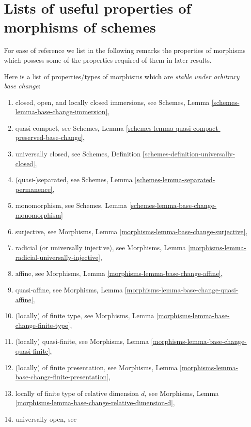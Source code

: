 \section{Lists of useful properties of morphisms of schemes}
\label{section-lists}

\noindent
For ease of reference we list in the following remarks the
properties of morphisms which possess some of the properties
required of them in later results.

\begin{remark}
\label{remark-list-properties-stable-base-change}
Here is a list of properties/types of morphisms
which are {\it stable under arbitrary base change}:
\begin{enumerate}
\item closed, open, and locally closed immersions, see
Schemes, Lemma \ref{schemes-lemma-base-change-immersion},
\item quasi-compact, see
Schemes, Lemma \ref{schemes-lemma-quasi-compact-preserved-base-change},
\item universally closed, see
Schemes, Definition \ref{schemes-definition-universally-closed},
\item (quasi-)separated, see
Schemes, Lemma \ref{schemes-lemma-separated-permanence},
\item monomorphism, see
Schemes, Lemma \ref{schemes-lemma-base-change-monomorphism}
\item surjective, see
Morphisms, Lemma \ref{morphisms-lemma-base-change-surjective},
\item radicial (or universally injective), see
Morphisms, Lemma \ref{morphisms-lemma-radicial-universally-injective},
\item affine, see
Morphisms, Lemma \ref{morphisms-lemma-base-change-affine},
\item quasi-affine, see
Morphisms, Lemma \ref{morphisms-lemma-base-change-quasi-affine},
\item (locally) of finite type, see
Morphisms, Lemma \ref{morphisms-lemma-base-change-finite-type},
\item (locally) quasi-finite, see
Morphisms, Lemma \ref{morphisms-lemma-base-change-quasi-finite},
\item (locally) of finite presentation, see
Morphisms, Lemma \ref{morphisms-lemma-base-change-finite-presentation},
\item locally of finite type of relative dimension $d$, see
Morphisms, Lemma \ref{morphisms-lemma-base-change-relative-dimension-d},
\item universally open, see

\end{enumerate}
\end{remark}

